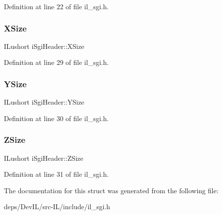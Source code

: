 Definition at line 22 of file il\+\_\+sgi.\+h.

\mbox{\label{structiSgiHeader_a3cb82c6006ec0fd90696dc6effdd43e5}} 
\subsubsection{\texorpdfstring{X\+Size}{XSize}}
{\footnotesize\ttfamily I\+Lushort i\+Sgi\+Header\+::\+X\+Size}



Definition at line 29 of file il\+\_\+sgi.\+h.

\mbox{\label{structiSgiHeader_a93d7f5f51bf2010bf57afe5f176d9cd4}} 
\subsubsection{\texorpdfstring{Y\+Size}{YSize}}
{\footnotesize\ttfamily I\+Lushort i\+Sgi\+Header\+::\+Y\+Size}



Definition at line 30 of file il\+\_\+sgi.\+h.

\mbox{\label{structiSgiHeader_abedfef396ebd243bf319adbcd20ef0ec}} 
\subsubsection{\texorpdfstring{Z\+Size}{ZSize}}
{\footnotesize\ttfamily I\+Lushort i\+Sgi\+Header\+::\+Z\+Size}



Definition at line 31 of file il\+\_\+sgi.\+h.



The documentation for this struct was generated from the following file\+:\begin{DoxyCompactItemize}
\item 
deps/\+Dev\+I\+L/src-\/\+I\+L/include/il\+\_\+sgi.\+h\end{DoxyCompactItemize}
